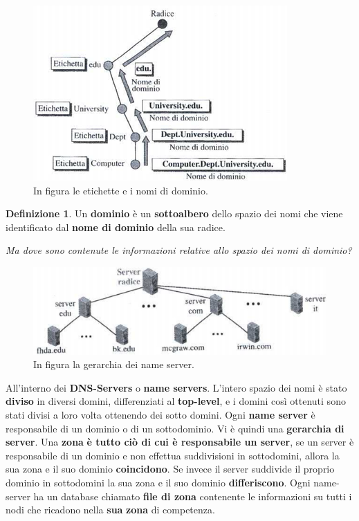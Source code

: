 \documentclass[11pt,a4paper,oneside]{book}
\theoremstyle{definition}
\newtheorem{definition}{Definizione}[section]
\begin{document}
\pagebreak

\begin{figure}[!h]
	\includegraphics[scale=0.7]{Immagini/Etichette_dns.png}
	\centering
	\caption{In figura le etichette e i nomi di dominio.}
\end{figure}
\theoremstyle{definition}
\begin{definition}
	Un \textbf{dominio} è un \textbf{sottoalbero} dello spazio dei nomi che viene identificato dal \textbf{nome di dominio} della sua radice.
\end{definition}
\textit{Ma dove sono contenute le informazioni relative allo spazio dei nomi di dominio?}

\begin{figure}[!h]
	\includegraphics[scale=0.6]{Immagini/Dnserver.png}
	\centering
	\caption{In figura la gerarchia dei name server.}
\end{figure}
All'interno dei \textbf{DNS-Servers} o \textbf{name servers}. L'intero spazio dei nomi è stato \textbf{diviso} in diversi domini, differenziati al \textbf{top-level}, e i domini così ottenuti sono stati divisi a loro volta ottenendo dei sotto domini. Ogni \textbf{name server} è responsabile di un dominio o di un sottodominio. Vi è quindi una \textbf{gerarchia di server}. Una \textbf{zona} \textbf{è tutto ciò di cui è responsabile un server}, se un server è responsabile di un dominio e non effettua suddivisioni in sottodomini, allora la sua zona e il suo dominio \textbf{coincidono}. Se invece il server suddivide il proprio dominio in sottodomini la sua zona e il suo dominio \textbf{differiscono}. Ogni name-server ha un database chiamato \textbf{file di zona} contenente le informazioni su tutti i nodi che ricadono nella \textbf{sua} \textbf{zona} di competenza.
\end{document}
